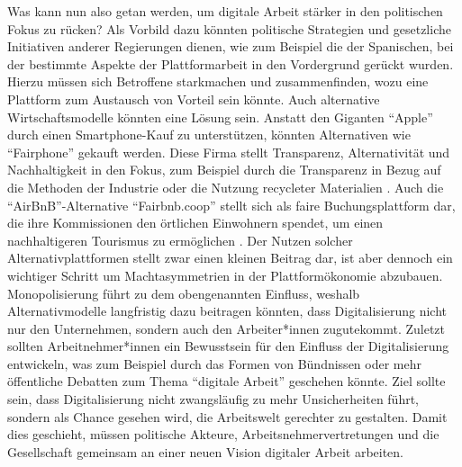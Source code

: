 \documentclass[12pt]{article}
\begin{document}
Was kann nun also getan werden, um digitale Arbeit stärker in den politischen Fokus zu rücken? Als Vorbild dazu könnten politische Strategien und gesetzliche Initiativen anderer Regierungen dienen, wie zum Beispiel die der Spanischen, bei der bestimmte Aspekte der Plattformarbeit in den Vordergrund gerückt wurden. Hierzu müssen sich Betroffene starkmachen und zusammenfinden, wozu eine Plattform zum Austausch von Vorteil sein könnte. Auch alternative Wirtschaftsmodelle könnten eine Lösung sein. Anstatt den Giganten \enquote{Apple} durch einen Smartphone-Kauf zu unterstützen, könnten Alternativen wie \enquote{Fairphone} gekauft werden. Diese Firma stellt Transparenz, Alternativität und Nachhaltigkeit in den Fokus, zum Beispiel durch die Transparenz in Bezug auf die Methoden der Industrie oder die Nutzung recycleter Materialien \autocite[vgl.][]{fairphone_wir_2025}. Auch die \enquote{AirBnB}-Alternative \enquote{Fairbnb.coop} stellt sich als faire Buchungsplattform dar, die ihre Kommissionen den örtlichen Einwohnern spendet, um einen nachhaltigeren Tourismus zu ermöglichen \autocite[vgl.][]{fairbnbcoop_fairbnbcoop_nodate}. Der Nutzen solcher Alternativplattformen stellt zwar einen kleinen Beitrag dar, ist aber dennoch ein wichtiger Schritt um Machtasymmetrien in der Plattformökonomie abzubauen. Monopolisierung führt zu dem obengenannten Einfluss, weshalb Alternativmodelle langfristig dazu beitragen könnten, dass Digitalisierung nicht nur den Unternehmen, sondern auch den Arbeiter*innen zugutekommt. Zuletzt sollten Arbeitnehmer*innen ein Bewusstsein für den Einfluss der Digitalisierung entwickeln, was zum Beispiel durch das Formen von Bündnissen oder mehr öffentliche Debatten zum Thema \enquote{digitale Arbeit} geschehen könnte. Ziel sollte sein, dass Digitalisierung nicht zwangsläufig zu mehr Unsicherheiten führt, sondern als Chance gesehen wird, die Arbeitswelt gerechter zu gestalten. Damit dies geschieht, müssen politische Akteure, Arbeitsnehmervertretungen und die Gesellschaft gemeinsam an einer neuen Vision digitaler Arbeit arbeiten.
\end{document}
